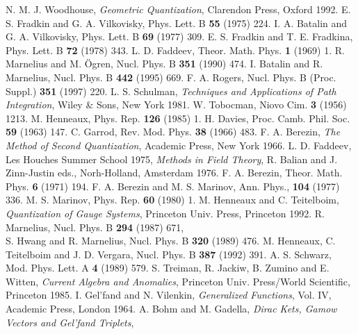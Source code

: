 \documentclass[a4paper,10pt]{article}
\begin{document}
\begin{thebibliography}{99}

\footnotesize
{}
N. M. J. Woodhouse, \textit{Geometric Quantization}, Clarendon Press, Oxford 1992.
E. S. Fradkin and G. A. Vilkovisky, Phys. Lett. B \textbf{55} (1975) 224.
I. A. Batalin and G. A. Vilkovisky, Phys. Lett. B \textbf{69} (1977) 309.
E. S. Fradkin and T. E. Fradkina, Phys. Lett. B \textbf{72} (1978) 343.
L. D. Faddeev, Theor. Math. Phys. \textbf{1} (1969) 1.
R. Marnelius and M. \"{O}gren, Nucl. Phys. B \textbf{351} (1990) 474.
I. Batalin and R. Marnelius, Nucl. Phys. B \textbf{442} (1995) 669.
F. A. Rogers, Nucl. Phys. B (Proc. Suppl.) \textbf{351} (1997) 220.
L. S. Schulman, \textit{Techniques and Applications of Path Integration}, Wiley \& Sons, 
New York 1981.
W. Tobocman, Niovo Cim. \textbf{3} (1956) 1213.
M. Henneaux, Phys. Rep. \textbf{126} (1985) 1.
H. Davies, Proc. Camb. Phil. Soc. \textbf{59} (1963) 147.
C. Garrod, Rev. Mod. Phys. \textbf{38} (1966) 483.
F. A. Berezin, \textit{The Method of Second Quantization}, Academic Press, New York 1966. 
L. D. Faddeev, Les Houches Summer School 1975, \textit{Methods in Field Theory}, R. 
Balian and J. Zinn-Justin eds., Norh-Holland, Amsterdam 1976.
F. A. Berezin, Theor. Math. Phys. \textbf{6} (1971) 194.
F. A. Berezin and M. S. Marinov, Ann. Phys., \textbf{104} (1977) 336. 
M. S. Marinov, Phys. Rep. \textbf{60} (1980) 1. 
M. Henneaux and C. Teitelboim, \textit{Quantization of Gauge Systems}, Princeton Univ. 
Press, Princeton 1992. 
R. Marnelius, Nucl. Phys. B \textbf{294} (1987) 671,\\
S. Hwang and R. Marnelius, Nucl. Phys. B \textbf{320} (1989) 476.
M. Henneaux, C. Teitelboim and J. D. Vergara, Nucl. Phys. B \textbf{387} (1992) 391.
A. S. Schwarz, Mod. Phys. Lett. A \textbf{4} (1989) 579.
S. Treiman, R. Jackiw, B. Zumino and E. Witten, \textit{Current Algebra and Anomalies}, 
Princeton Univ. Press/World Scientific, Princeton 1985.
I. Gel'fand and N. Vilenkin, \textit{Generalized Functions}, Vol. IV, Academic Press, 
London 1964.
A. Bohm and M. Gadella, \textit{Dirac Kets, Gamow Vectors and Gel'fand Triplets}, 

\end{thebibliography}
\end{document}
